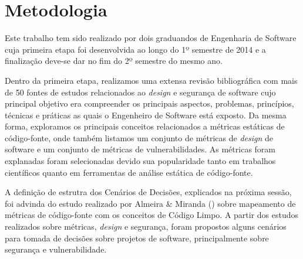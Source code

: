 \section{Metodologia}
\label{sec:methodology}

Este trabalho tem sido realizado por dois graduandos de Engenharia de Software cuja primeira etapa foi desenvolvida ao longo do 1º semestre de 2014 e a finalização deve-se dar no fim do 2º semestre do mesmo ano.
%

Dentro da primeira etapa, realizamos uma extensa revisão bibliográfica com mais de 50 fontes de estudos relacionados ao \emph{design} e segurança de software cujo principal objetivo era compreender os principais aspectos, problemas, princípios, técnicas e práticas as quais o Engenheiro de Software está exposto. Da mesma forma, exploramos os principais conceitos relacionados a métricas estáticas de código-fonte, onde também listamos um conjunto de métricas de \emph{design} de software e um conjunto de métricas de vulnerabilidades. As métricas foram explanadas foram selecionadas devido sua popularidade tanto em trabalhos científicos quanto em ferramentas de análise estática de código-fonte.

A definição de estrutra dos Cenários de Decisões, explicados na próxima sessão, foi advinda do estudo realizado por Almeira \& Miranda (\citeyear{almeida2010}) sobre mapeamento de métricas de código-fonte com os conceitos de Código Limpo. A partir dos estudos realizados sobre métricas, \emph{design} e segurança, foram propostos alguns cenários para tomada de decisões sobre projetos de software, principalmente sobre segurança e vulnerabilidade.